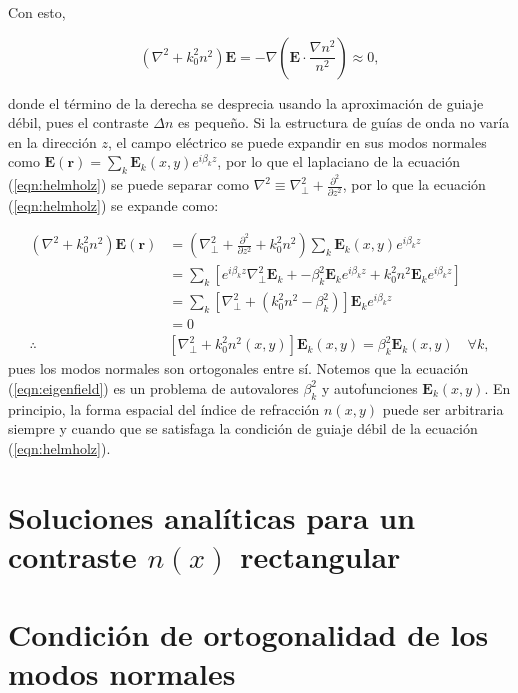Con esto, 

\begin{equation}
	(\nabla^2  + k_0^2n^2)\textbf{E} = -\nabla\left(\textbf{E} \cdot \frac{\nabla n^2}{n^2}\right) \approx 0, \label{eqn:helmholz}
\end{equation}

donde el término de la derecha se desprecia usando la aproximación de guiaje débil, pues el contraste $\Delta n$ es pequeño. Si la estructura de guías de onda no varía en la dirección $z$, el campo eléctrico se puede expandir en sus modos normales como $\textbf{E}(\textbf{r}) = \sum_k \textbf{E}_k(x, y) e^{i\beta_k z}$, por lo que el laplaciano de la ecuación (\ref{eqn:helmholz}) se puede separar como $\nabla^2 \equiv \nabla_\perp^2 + \frac{\partial^2}{\partial z^2}$, por lo que la ecuación (\ref{eqn:helmholz}) se expande como:

\begin{align}
	(\nabla^2  + k_0^2n^2) \textbf{E}(\textbf{r}) &= \left(\nabla_\perp^2 + \frac{\partial^2}{\partial z^2} + k_0^2n^2\right)\sum_k \textbf{E}_k(x, y)  e^{i\beta_k z} \nonumber
\\	
	&= \sum_k \left[ e^{i\beta_k z} \nabla_\perp^2 \textbf{E}_k + -\beta_k^2\textbf{E}_k e^{i\beta_k z} + k_0^2n^2 \textbf{E}_k  e^{i\beta_k z}\right]
\nonumber	
	\\	
	&= \sum_k \left[  \nabla_\perp^2  + (k_0^2n^2-\beta_k^2) \right]\textbf{E}_k  e^{i\beta_k z}
	\nonumber	
	\\
	&=
	0
	\nonumber
	\\
	\therefore
	& \left[  \nabla_\perp^2  + k_0^2n^2(x,y) \right]\textbf{E}_k(x,y)  = \beta_k^2 \textbf{E}_k(x,y) \quad \forall k, \label{eqn:eigenfield}
\end{align}
pues los modos normales son ortogonales entre sí.
Notemos que la ecuación (\ref{eqn:eigenfield}) es un problema de autovalores $\beta_k^2$ y autofunciones $\textbf{E}_k(x,y)$. En principio, la forma espacial del índice de refracción $n(x, y)$ puede ser arbitraria siempre y cuando que se satisfaga la condición de guiaje débil de la ecuación (\ref{eqn:helmholz}). 
 
\section{Soluciones analíticas para un contraste $n(x)$ rectangular}




\section{Condición de ortogonalidad de los modos normales}

